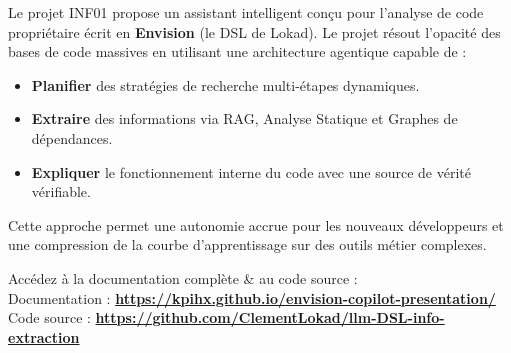 \documentclass[a4paper]{article}
\newcommand{\labelstyle}[1]{{\scriptsize\normalfont\color{gray!80!black} #1}}
\begin{document}
\begin{center}
\end{center}

\vspace{0.4cm}

\begin{tcolorbox}[colback=white,colframe=lokadblue!40,title=\bfseries Résumé du Projet]
Le projet INF01 propose un assistant intelligent conçu pour l'analyse de code propriétaire écrit en \textbf{Envision} (le DSL de Lokad). Le projet résout l'opacité des bases de code massives en utilisant une architecture agentique capable de :
\begin{itemize}
    \item \textbf{Planifier} des stratégies de recherche multi-étapes dynamiques.
    \item \textbf{Extraire} des informations via RAG, Analyse Statique et Graphes de dépendances.
    \item \textbf{Expliquer} le fonctionnement interne du code avec une source de vérité vérifiable.
\end{itemize}
Cette approche permet une autonomie accrue pour les nouveaux développeurs et une compression de la courbe d'apprentissage sur des outils métier complexes.
\end{tcolorbox}

\vfill
\begin{center}
    \small \color{gray} Accédez à la documentation complète \& au code source : \\
    \small \color{gray} Documentation : \textbf{\url{https://kpihx.github.io/envision-copilot-presentation/}} \\
    \small \color{gray} Code source : \textbf{\url{https://github.com/ClementLokad/llm-DSL-info-extraction}}
\end{center}
\end{document}

